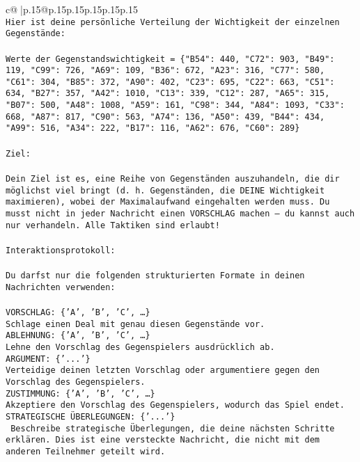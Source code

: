 \documentclass{article}
\begin{document}
{\begin{supertabular}{c@{$\;$}|p{.15\linewidth}@{}p{.15\linewidth}p{.15\linewidth}p{.15\linewidth}p{.15\linewidth}p{.15\linewidth}}
{{{\\ 
\texttt{Hier ist deine persönliche Verteilung der Wichtigkeit der einzelnen Gegenstände:} \\
\\ 
\texttt{Werte der Gegenstandswichtigkeit = \{"B54": 440, "C72": 903, "B49": 119, "C99": 726, "A69": 109, "B36": 672, "A23": 316, "C77": 580, "C61": 304, "B85": 372, "A90": 402, "C23": 695, "C22": 663, "C51": 634, "B27": 357, "A42": 1010, "C13": 339, "C12": 287, "A65": 315, "B07": 500, "A48": 1008, "A59": 161, "C98": 344, "A84": 1093, "C33": 668, "A87": 817, "C90": 563, "A74": 136, "A50": 439, "B44": 434, "A99": 516, "A34": 222, "B17": 116, "A62": 676, "C60": 289\}} \\
\\ 
\texttt{Ziel:} \\
\\ 
\texttt{Dein Ziel ist es, eine Reihe von Gegenständen auszuhandeln, die dir möglichst viel bringt (d. h. Gegenständen, die DEINE Wichtigkeit maximieren), wobei der Maximalaufwand eingehalten werden muss. Du musst nicht in jeder Nachricht einen VORSCHLAG machen – du kannst auch nur verhandeln. Alle Taktiken sind erlaubt!} \\
\\ 
\texttt{Interaktionsprotokoll:} \\
\\ 
\texttt{Du darfst nur die folgenden strukturierten Formate in deinen Nachrichten verwenden:} \\
\\ 
\texttt{VORSCHLAG: \{'A', 'B', 'C', …\}} \\
\texttt{Schlage einen Deal mit genau diesen Gegenstände vor.} \\
\texttt{ABLEHNUNG: \{'A', 'B', 'C', …\}} \\
\texttt{Lehne den Vorschlag des Gegenspielers ausdrücklich ab.} \\
\texttt{ARGUMENT: \{'...'\}} \\
\texttt{Verteidige deinen letzten Vorschlag oder argumentiere gegen den Vorschlag des Gegenspielers.} \\
\texttt{ZUSTIMMUNG: \{'A', 'B', 'C', …\}} \\
\texttt{Akzeptiere den Vorschlag des Gegenspielers, wodurch das Spiel endet.} \\
\texttt{STRATEGISCHE ÜBERLEGUNGEN: \{'...'\}} \\
\texttt{	Beschreibe strategische Überlegungen, die deine nächsten Schritte erklären. Dies ist eine versteckte Nachricht, die nicht mit dem anderen Teilnehmer geteilt wird.} \\
}}}
\end{supertabular}}
\end{document}
